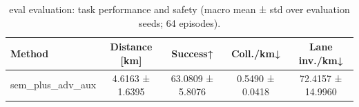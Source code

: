 \begin{table}
\caption{eval evaluation: task performance and safety (macro mean ± std over evaluation seeds; 64 episodes).}
\label{tab:eval_task_performance}
\begin{tabular}{lcccc}
\toprule
Method & Distance [km] & Success↑ & Coll./km↓ & Lane inv./km↓ \\
\midrule
sem_plus_adv_aux & 4.6163 ± 1.6395 & 63.0809 ± 5.8076 & 0.5490 ± 0.0418 & 72.4157 ± 14.9960 \\
\bottomrule
\end{tabular}
\end{table}
